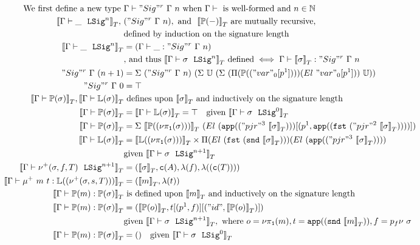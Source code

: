 \begin{align*}
  \text{We first define a new type }& \goodType{\Gamma}{\Sigr{\Gamma}{n}}{}  \text{ when } \goodCtx{\Gamma}{}  \text{ is well-formed and } n \in \mathbb{N} \\
  \denotesT{\goodSig{\Gamma}{\_}{n}},\ &({\Sigr{\Gamma}{n}}), \text{ and } \ \denotesT{\TyTkg {-}} \text{ are mutually recursive, } \\
  & \text{defined by induction on the signature length} \\  
  \denotesT{\goodSig{\Gamma}{\_}{n}} &= (\goodTerm{\Gamma}{\_}{\Sigr{\Gamma}{n}}) \\ 
  &\text{, and thus } \denotesT{\goodSig{\Gamma}{\sigma}{n}} \text{ defined} \iff \goodTerm{\Gamma}{\denotesT{\sigma}}{\Sigr{\Gamma}{n}} \\ 
  {\Sigr{\Gamma}{(n+1)}} &= 
    \Sigma~(\Sigr{\Gamma}{n})
          ~(\Sigma~\cU
                  ~(\Sigma~(\Pi(\TyTkg {("var"_0[p^1])})(El~"var"_0[p^1]))~\cU)) \\
  \Sigr{\Gamma}{0} &= \top \\
  \denotesT{\goodType{\Gamma}{\TyTkg {\sigma}}{}}, \denotesT{\goodType{\Gamma}{\TyLkg{\sigma}}{}} &\text{ defines upon } \denotesT{\sigma} 
  \text{ and inductively on the signature length} \\
  \denotesT{\goodType{\Gamma}{\TyTkg {\sigma}}{}} &= \denotesT{\goodType{\Gamma}{\TyLkg{\sigma}}{}} = \top \quad
      \text{given } \denotesT{\goodSig{\Gamma}{\sigma}{0}} \\ 
  \denotesT{\goodType{\Gamma}{\TyTkg {\sigma}}{}} &= 
    \Sigma~\denotesT{\TyTkg {(\lsigproj{1}{\sigma})}}~(El \ (\app{("pjr"^3~\denotesT{\sigma})})[(p^1, \app{(\fst{("pjr"^2~{\denotesT{\sigma}})})})]) \\
  \denotesT{\goodType{\Gamma}{\TyLkg{\sigma}}{}} &=
  \denotesT{\TyLkg{(\lsigproj{1}{\sigma})}} \times \Pi(El~(\fst{(\snd{\denotesT{\sigma}})}))(El~(\app{("pjr"^3~\denotesT{\sigma})} )) \\
  &\text{given } \denotesT{\goodSig{\Gamma}{\sigma}{n+1}} \\
  \denotesT{\goodSig{\Gamma}{\LSigAdd{\sigma}{f}{T}}{n+1}} &= (\denotesT{\sigma}, \codety{A}, \lam{f}, \lam{(\codety{T})}) \\ 
  \denotesT{\goodTerm{\Gamma}{\mu^+~m~t}{\TyLkg{(\LSigAdd{\sigma}{s}{T})}}} &= (\denotesT{m}, \lam{t}) \\ 
  \denotesT{\goodTerm{\Gamma}{\Tkg{m}}{\TyTkg {\sigma}}} & \text{ is defined upon } \denotesT{m} \text{ and inductively on the signature length} \\ 
  \denotesT{\goodTerm{\Gamma}{\Tkg {m}}{\TyTkg {\sigma}}} &= 
  (\denotesT{\Tkg {o}}, t[(\SubstExt{p^1}{f})][(\SubstExt{"id"}{\denotesT{\Tkg {o}}})]) \\
  & \text{given } \denotesT{\goodSig{\Gamma}{\sigma}{n+1}}, \text{ where } o = \lsigproj{1}{m}, t = \app{(\snd{\denotesT{m}})}, f = p_f\nu~\sigma \\ 
  \denotesT{\goodTerm{\Gamma}{\Tkg {m}}{\TyTkg {\sigma}}} &= () \quad \text{given } \denotesT{\goodSig{\Gamma}{\sigma}{0}}
\end{align*}
